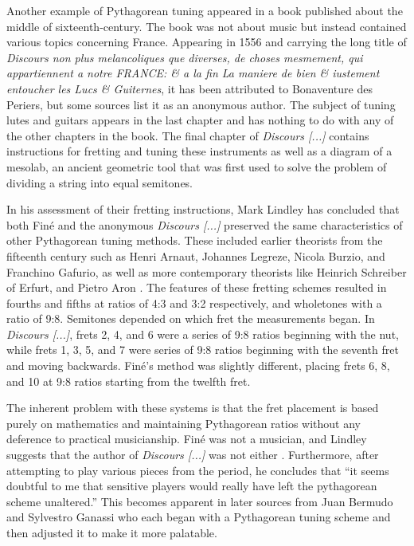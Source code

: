 Another example of Pythagorean tuning appeared in a book published about the middle of sixteenth-century. The book was
not about music but instead contained various topics concerning France. Appearing in 1556 and carrying the long title of
\textit{Discours non plus melancoliques que diverses, de choses mesmement, qui appartiennent a notre FRANCE: \& a la fin
La maniere de bien \& iustement entoucher les Lucs \& Guiternes}, it has been attributed to Bonaventure des Periers, but
some sources list it as an anonymous author. The subject of tuning lutes and guitars appears in the last chapter and has
nothing to do with any of the other chapters in the book. The final chapter of \textit{Discours [...]} contains
instructions for fretting and tuning these instruments as well as a diagram of a mesolab, an ancient geometric tool that
was first used to solve the problem of dividing a string into equal semitones.

In his assessment of their fretting instructions, Mark Lindley has concluded that both Fin\'{e} and the anonymous
\textit{Discours [...]} preserved the same characteristics of other Pythagorean tuning methods. These included earlier
theorists from the fifteenth century such as Henri Arnaut, Johannes Legreze, Nicola Burzio, and Franchino Gafurio, as
well as more contemporary theorists like Heinrich Schreiber of Erfurt, and Pietro Aron \autocite[11]{ML:1}. The features
of these fretting schemes resulted in fourths and fifths at ratios of 4:3 and 3:2 respectively, and wholetones with a
ratio of 9:8. Semitones depended on which fret the measurements began. In \textit{Discours [...]}, frets 2, 4, and 6
were a series of 9:8 ratios beginning with the nut, while frets 1, 3, 5, and 7 were series of 9:8 ratios beginning with
the seventh fret and moving backwards. Fin\'{e}'s method was slightly different, placing frets 6, 8, and 10 at 9:8
ratios starting from the twelfth fret.

The inherent problem with these systems is that the fret placement is based purely on mathematics and maintaining
Pythagorean ratios without any deference to practical musicianship. Fin\'{e} was not a musician, and Lindley suggests
that the author of \textit{Discours [...]} was not either \autocite[11]{ML:1}. Furthermore, after attempting to play
various pieces from the period, he concludes that ``it seems doubtful to me that sensitive players would really have
left the pythagorean scheme unaltered.'' \autocite[13]{ML:1} This becomes apparent in later sources from Juan Bermudo
and Sylvestro Ganassi who each began with a Pythagorean tuning scheme and then adjusted it to make it more palatable.

